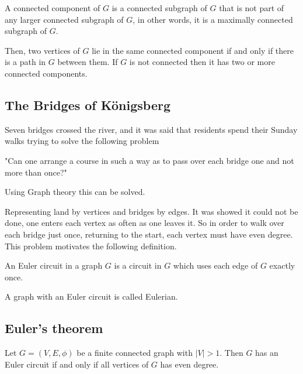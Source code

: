 \documentclass[10pt, a4paper]{article}
\begin{document}
A connected component of $G$ is a connected subgraph of $G$ that is not part of any larger connected subgraph of $G$,
in other words,
it is a maximally connected subgraph of $G$.

Then,
two vertices of $G$ lie in the same connected component if and only if there is a path in $G$ between them.
If $G$ is not connected then it has two or more connected components.

\subsection{The Bridges of K\"onigsberg}
Seven bridges crossed the river,
and it was said that residents spend their Sunday walks trying to solve the following problem
\begin{center}
    "Can one arrange a course in such a way as to pass over each bridge one and not more than once?"
\end{center}
Using Graph theory this can be solved.

Representing land by vertices and bridges by edges.
It was showed it could not be done,
one enters each vertex as often as one leaves it.
So in order to walk over each bridge just once,
returning to the start,
each vertex must have even degree.
This problem motivates the following definition.

\begin{definition}
    An Euler circuit in a graph $G$ is a circuit in $G$ which  uses each edge of $G$ exactly once.
\end{definition}

A graph with an Euler circuit is called Eulerian.

\subsection{Euler's theorem}
\begin{theorem}
    Let $G = (V, E, \phi)$ be a finite connected graph with $|V| > 1$.
    Then $G$ has an Euler circuit if and only if all vertices of $G$ has even degree.
\end{theorem}
\end{document}
